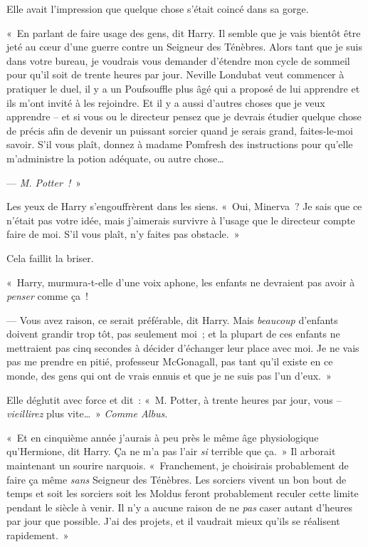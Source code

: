 Elle avait l'impression que quelque chose s'était coincé dans sa gorge.

«~En parlant de faire usage des gens, dit Harry.
Il semble que je vais bientôt être jeté au cœur d'une guerre contre un Seigneur des Ténèbres.
Alors tant que je suis dans votre bureau, je voudrais vous demander d'étendre mon cycle de sommeil pour qu'il soit de trente heures par jour.
Neville Londubat veut commencer à pratiquer le duel, il y a un Poufsouffle plus âgé qui a proposé de lui apprendre et ils m'ont invité à les rejoindre.
Et il y a aussi d'autres choses que je veux apprendre -- et si vous ou le directeur pensez que je devrais étudier quelque chose de précis afin de devenir un puissant sorcier quand je serais grand, faites-le-moi savoir.
S'il vous plaît, donnez à madame Pomfresh des instructions pour qu'elle m'administre la potion adéquate, ou autre chose…

--- \emph{M. Potter~!}~»

Les yeux de Harry s'engouffrèrent dans les siens.
«~Oui, Minerva~?
Je sais que ce n'était pas votre idée, mais j'aimerais survivre à l'usage que le directeur compte faire de moi.
S'il vous plaît, n'y faites pas obstacle.~»

Cela faillit la briser.

«~Harry, murmura-t-elle d'une voix aphone, les enfants ne devraient pas avoir à \emph{penser} comme ça~!

--- Vous avez raison, ce serait préférable, dit Harry.
Mais \emph{beaucoup} d'enfants doivent grandir trop tôt, pas seulement moi~; et la plupart de ces enfants ne mettraient pas cinq secondes à décider d'échanger leur place avec moi.
Je ne vais pas me prendre en pitié, professeur McGonagall, pas tant qu'il existe en ce monde, des gens qui ont de vrais ennuis et que je ne suis pas l'un d'eux.~»

Elle déglutit avec force et dit~: «~M. Potter, à trente heures par jour, vous -- \emph{vieillirez} plus vite…~»
\emph{Comme Albus}.

«~Et en cinquième année j'aurais à peu près le même âge physiologique qu'Hermione, dit Harry.
Ça ne m'a pas l'air \emph{si} terrible que ça.~»
Il arborait maintenant un sourire narquois.
«~Franchement, je choisirais probablement de faire ça même \emph{sans} Seigneur des Ténèbres.
Les sorciers vivent un bon bout de temps et soit les sorciers soit les Moldus feront probablement reculer cette limite pendant le siècle à venir.
Il n'y a aucune raison de ne \emph{pas} caser autant d'heures par jour que possible.
J'ai des projets, et il vaudrait mieux qu'ils se réalisent rapidement.~»

